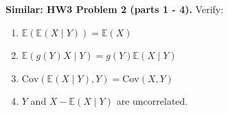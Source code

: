 \documentclass{article}
\newcommand{\E}{\mathbb{E}}
\newcommand{\Cov}{\mathrm{Cov}}
\begin{document}
%
%
%
%

\textbf{Similar: HW3 Problem 2 (parts 1 - 4).} Verify:

\begin{enumerate}[(1)]

\item \(\E(\E(X\mid Y)) = \E(X)\)

\item \( \E(g(Y) X \mid Y) = g(Y) \E(X \mid Y) \)

\item \(\Cov ( \E(X \mid Y), Y ) = \Cov(X , Y)\)

\item \(Y\) and \(X - \E(X \mid Y)\) are uncorrelated.

\end{enumerate}
\end{document}
